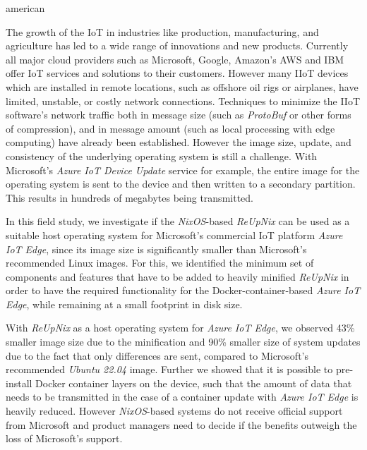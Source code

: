 \begin{otherlanguage*}{american}

The growth of the \ac{IoT} in industries like production, manufacturing, and
agriculture has led to a wide range of innovations and new products. Currently
all major cloud providers such as Microsoft, Google, Amazon's AWS and IBM offer
\ac{IoT} services and solutions to their customers. However many \ac{IIoT} devices
which are installed in remote locations, such as offshore oil rigs or airplanes,
have limited, unstable, or costly network connections. Techniques to
minimize the \ac{IIoT} software’s network traffic both in message size
(such as \textit{ProtoBuf} or other forms of compression), and in message amount
(such as local processing with edge computing) have already been established.
However the image size, update, and consistency of the underlying operating
system is still a challenge. With Microsoft's \textit{Azure IoT Device
Update} service for example, the entire image for the operating system is sent
to the device and then written to a secondary partition. This results in hundreds
of megabytes being transmitted.

In this field study, we investigate if the \textit{NixOS}-based \textit{ReUpNix}
can be used as a suitable host operating system for Microsoft’s commercial
\ac{IoT} platform \textit{Azure IoT Edge}, since its image size is significantly
smaller than Microsoft's recommended Linux images.
 For this, we identified the
minimum set of components and features that have to be added to heavily minified
\textit{ReUpNix} in order to have the required functionality for the
Docker-container-based \textit{Azure IoT Edge}, while remaining at a small
footprint in disk size.

With \textit{ReUpNix} as a host operating system for \textit{Azure IoT Edge}, we
observed 43\% smaller image size due to the minification and 90\% smaller size of
system updates due to the fact that only differences are sent, compared to
Microsoft's recommended \textit{Ubuntu 22.04}
image. Further we showed that it is possible to pre-install Docker container
layers on the device, such that the amount of data that needs to be transmitted
in the case of a container update with \textit{Azure IoT Edge} is heavily reduced.
However \textit{NixOS}-based systems do not receive official support from
Microsoft and product managers need to decide if the benefits outweigh the loss
of Microsoft's support.

\end{otherlanguage*}


